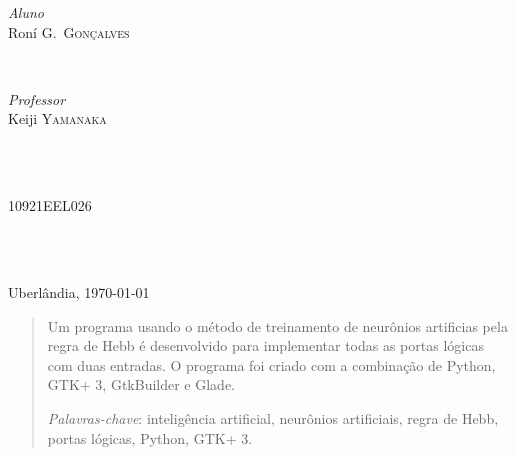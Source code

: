 \documentclass[11pt]{article}
\begin{document}
\begin{titlepage}
\begin{minipage}{0.4\textwidth}
\begin{flushleft} \large
\emph{Aluno}\\
Roní G.\ \textsc{Gonçalves}\\%
\end{flushleft}
\end{minipage}
~
\begin{minipage}{0.4\textwidth}
\begin{flushright} \large
\emph{Professor} \\
Keiji \textsc{Yamanaka}\\ %
\end{flushright}
\end{minipage}\\[0.1cm]
~
\begin{minipage}{0.85\textwidth}
\begin{flushleft} \large
10921EEL026 %
\end{flushleft}
\end{minipage}\\[3cm]
~


{\large Uberlândia, \today}\\[1cm] %


\vfill %

\end{titlepage}

\setcounter{page}{2}

\newpage

\begin{abstract}
Um programa usando o método de treinamento de neurônios artificias pela regra de Hebb é desenvolvido para implementar todas as portas lógicas com duas entradas. O programa foi criado com a combinação de Python, GTK+ 3, GtkBuilder e Glade.

\emph{Palavras-chave}: inteligência artificial, neurônios artificiais, regra de Hebb, portas lógicas, Python, GTK+ 3.
\end{abstract}
\end{document}
